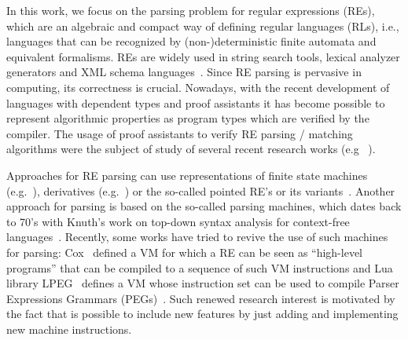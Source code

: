 \documentclass[oneside,12pt]{scrbook}
\theoremstyle{definition}
\theoremstyle{plain}
\theoremstyle{definition}
\begin{document}
In this work, we focus on the parsing problem for regular expressions (REs), which are an algebraic
and compact way of defining regular languages (RLs), i.e., languages that can be recognized by
(non-)deterministic finite automata and equivalent formalisms. REs are widely used in string search
tools, lexical analyzer generators and XML schema languages~\cite{Frisch2004}. Since RE parsing
is pervasive in computing, its correctness is crucial. Nowadays, with the recent
development of languages with dependent types and proof assistants it has become
possible to represent algorithmic properties as program types which are verified
by the compiler. The usage of proof assistants to verify RE parsing / matching algorithms
were the subject of study of several recent research works (e.g ~\cite{Firsov13,Ribeiro2017,Lopes2016,Asperti10}).

Approaches for RE parsing can use representations of finite state machines (e.g.~\cite{Firsov13}),
derivatives (e.g.~\cite{Ribeiro2017,Lopes2018,Lopes2016}) or the so-called pointed RE's or its
variants~\cite{Asperti10,Fischer2010}. Another approach for parsing is based on the so-called
parsing machines, which dates back to 70's with Knuth's work
on top-down syntax analysis for context-free languages~\cite{Knuth71}. Recently, some works
have tried to revive the use of such machines for parsing: Cox~\cite{Cox2009} defined a VM
for which a RE can be seen as ``high-level programs'' that can be compiled to a sequence of
such VM instructions and Lua library LPEG~\cite{Ierusalimschy2009} defines a VM whose instruction
set can be used to compile Parser Expressions Grammars (PEGs)~\cite{Ford04}. Such renewed research
interest is motivated by the fact that is possible to include new features by just adding and
implementing new machine instructions.
\end{document}
